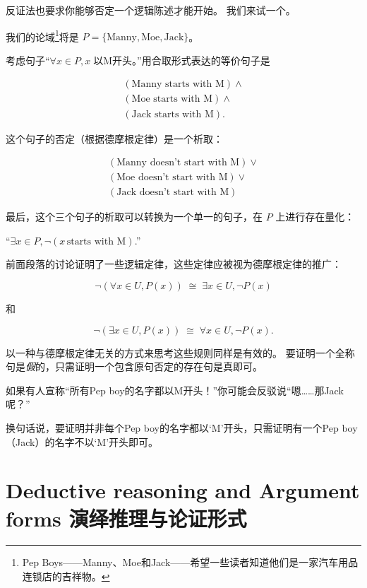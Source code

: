 反证法也要求你能够否定一个逻辑陈述才能开始。
我们来试一个。

我们的论域\footnote{Pep Boys——Manny、Moe和Jack——希望一些读者知道他们是一家汽车用品连锁店的吉祥物。}将是 $P = \{ \mbox{Manny}, \mbox{Moe}, \mbox{Jack} \}$。

考虑句子“$\forall x \in P, x\; \mbox{以M开头}$。”用合取形式表达的等价句子是

\begin{gather*} (\mbox{Manny starts with M}) \land \\
(\mbox{Moe starts with M}) \land \\
(\mbox{Jack starts with M}).
\end{gather*}

\noindent 这个句子的否定（根据德摩根定律）是一个析取：

\begin{gather*}
(\mbox{Manny doesn't start with M}) \lor \\ 
(\mbox{Moe doesn't start with M}) \lor \\
(\mbox{Jack doesn't start with M})
\end{gather*}

\noindent 最后，这个三个句子的析取可以转换为一个单一的句子，在 $P$ 上进行存在量化：

``$\exists x \in P, {\lnot}(x \, \mbox{starts with M})$.'' 

前面段落的讨论证明了一些逻辑定律，这些定律应被视为德摩根定律的推广：

\[ 
{\lnot}( \forall x \in U, P(x)) \; \cong \; \exists x \in U, {\lnot}P(x)
\]

\noindent 和

\[ 
{\lnot}( \exists x \in U, P(x)) \; \cong \; \forall x \in U, {\lnot}P(x).
\]

以一种与德摩根定律无关的方式来思考这些规则同样是有效的。
要证明一个全称句是{\em 假}的，只需证明一个包含原句否定的存在句是真即可。

如果有人宣称“所有Pep boy的名字都以M开头！”你可能会反驳说“嗯……那Jack呢？”

换句话说，要证明并非每个Pep boy的名字都以‘M’开头，只需证明有一个Pep boy（Jack）的名字不以‘M’开头即可。

\clearpage





\newpage

\section{Deductive reasoning and Argument forms 演绎推理与论证形式}
\label{sec:deduct}

